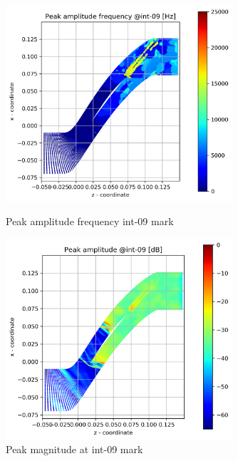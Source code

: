 \begin{figure}[ht]
  \centering
  \includegraphics[width=0.75\textwidth]{Figures/int-09-peak-freq.png}
  \caption{Peak amplitude frequency int-09 mark} \label{int-09-peak-freq}
  
  \vspace*{\floatsep}%

  \includegraphics[width=0.75\textwidth]{Figures/int-09-peak-mag.png}
  \caption{Peak magnitude at int-09 mark} \label{int-09-peak-mag}
\end{figure}


